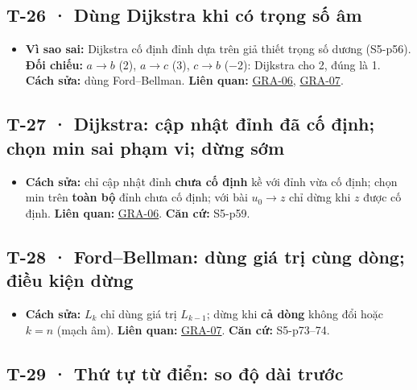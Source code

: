 \documentclass[
  10pt,
  twoside,openany]{book}
\providecommand{\tightlist}{%
  \setlength{\itemsep}{0pt}\setlength{\parskip}{0pt}}
\begin{document}
\hypertarget{T-26}{%
\subsection{T-26 · Dùng Dijkstra khi có trọng số âm}\label{T-26}}

\begin{itemize}
\tightlist
\item
  \textbf{Vì sao sai:} Dijkstra cố định đỉnh dựa trên giả thiết trọng số
  dương (S5-p56). \textbf{Đối chiếu:} \(a\to b\) (2), \(a\to c\) (3),
  \(c\to b\) (−2): Dijkstra cho 2, đúng là 1. \textbf{Cách sửa:} dùng
  Ford--Bellman. \textbf{Liên quan:} \protect\hyperlink{GRA-06}{GRA-06},
  \protect\hyperlink{GRA-07}{GRA-07}.
\end{itemize}

\hypertarget{T-27}{%
\subsection{T-27 · Dijkstra: cập nhật đỉnh đã cố định; chọn min sai phạm
vi; dừng sớm}\label{T-27}}

\begin{itemize}
\tightlist
\item
  \textbf{Cách sửa:} chỉ cập nhật đỉnh \textbf{chưa cố định} kề với đỉnh
  vừa cố định; chọn min trên \textbf{toàn bộ} đỉnh chưa cố định; với bài
  \(u_0\to z\) chỉ dừng khi \(z\) được cố định. \textbf{Liên quan:}
  \protect\hyperlink{GRA-06}{GRA-06}. \textbf{Căn cứ:} S5-p59.
\end{itemize}

\hypertarget{T-28}{%
\subsection{T-28 · Ford--Bellman: dùng giá trị cùng dòng; điều kiện
dừng}\label{T-28}}

\begin{itemize}
\tightlist
\item
  \textbf{Cách sửa:} \(L_k\) chỉ dùng giá trị \(L_{k-1}\); dừng khi
  \textbf{cả dòng} không đổi hoặc \(k=n\) (mạch âm). \textbf{Liên quan:}
  \protect\hyperlink{GRA-07}{GRA-07}. \textbf{Căn cứ:} S5-p73--74.
\end{itemize}

\hypertarget{T-29}{%
\subsection{T-29 · Thứ tự từ điển: so độ dài trước}\label{T-29}}
\end{document}
